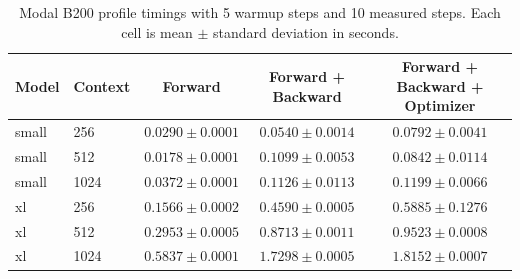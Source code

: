 \begin{table}
\centering
\caption{Modal B200 profile timings with 5 warmup steps and 10 measured steps. Each cell is mean $\pm$ standard deviation in seconds.}
\label{tab:modal-18-profile-timings}
\begin{tabular}{llccc}
\toprule
Model & Context & Forward & Forward + Backward & Forward + Backward + Optimizer \\
\midrule
small & 256 & $0.0290 \pm 0.0001$ & $0.0540 \pm 0.0014$ & $0.0792 \pm 0.0041$ \\
small & 512 & $0.0178 \pm 0.0001$ & $0.1099 \pm 0.0053$ & $0.0842 \pm 0.0114$ \\
small & 1024 & $0.0372 \pm 0.0001$ & $0.1126 \pm 0.0113$ & $0.1199 \pm 0.0066$ \\
xl & 256 & $0.1566 \pm 0.0002$ & $0.4590 \pm 0.0005$ & $0.5885 \pm 0.1276$ \\
xl & 512 & $0.2953 \pm 0.0005$ & $0.8713 \pm 0.0011$ & $0.9523 \pm 0.0008$ \\
xl & 1024 & $0.5837 \pm 0.0001$ & $1.7298 \pm 0.0005$ & $1.8152 \pm 0.0007$ \\
\bottomrule
\end{tabular}
\end{table}
